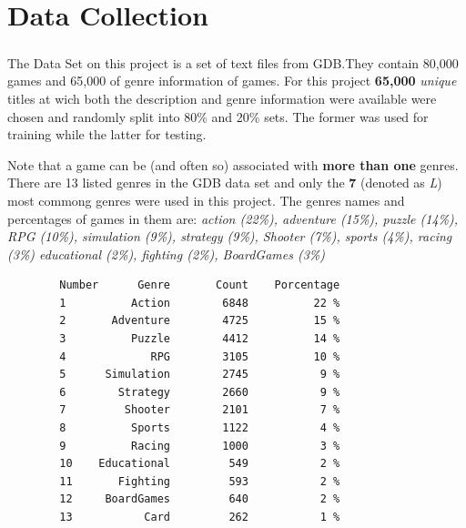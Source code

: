 \documentclass{book}
\begin{document}
    \chapter{Data Collection}
    \paragraph{}

    The Data Set on this project is a set of text files from GDB.They contain 80,000 games and 65,000 of genre information of games. For this project \textbf{65,000} \textit{unique} titles at wich both the description and genre information were available were chosen and randomly split into 80\% and 20\% sets. The former was used for training while the latter for testing.

    Note that a game can be (and often so) associated with \textbf{more than one} genres. There are 13 listed genres in the GDB data set and only the \textbf{7} (denoted as \textit{L}) most commong genres were used in this project. The genres names and percentages of games in them are: \textit{action (22\%), adventure (15\%), puzzle (14\%), RPG (10\%), simulation (9\%), strategy (9\%), Shooter (7\%), sports (4\%), racing (3\%) educational (2\%), fighting (2\%), BoardGames (3\%)}


    \begin{verbatim}
        Number      Genre       Count    Porcentage
        1          Action        6848          22 %
        2       Adventure        4725          15 %
        3          Puzzle        4412          14 %
        4             RPG        3105          10 %
        5      Simulation        2745           9 %
        6        Strategy        2660           9 %
        7         Shooter        2101           7 %
        8          Sports        1122           4 %
        9          Racing        1000           3 %
        10    Educational         549           2 %
        11       Fighting         593           2 %
        12     BoardGames         640           2 %
        13           Card         262           1 %
    \end{verbatim}
\end{document}
